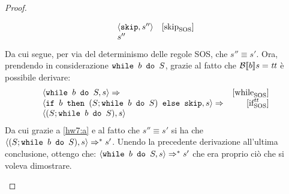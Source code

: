 {\begin{proof}
\begin{itemize}
$$\begin{array}{ll}
		\confSs{\skipForFriends}{s''} & \skipSOS\\
		s''
	\end{array}
	$$
	Da cui segue, per via del determinismo delle regole SOS, che $s'' \equiv s'$.
	Ora, prendendo in considerazione $\wbS{b}{S}$, grazie al fatto che
	$\B{b} = \semtrue$ è possibile derivare:
	$$
	\begin{array}{lr}
	\confSs{\wbS{b}{S}}{s} \Rar{ } & \whileSOS \\
	\confSs{\ifABC{b}{(S; \wbS{b}{S})}{\skipForFriends}}{s}  \Rar{ } & \ifttSOS \\
	\confSs{(S; \wbS{b}{S})}{s} & \\
	\end{array}
	$$
	Da cui grazie a \ref{hw7:a} e al fatto che $s'' \equiv s'$ si ha che
	$\confSs{(S; \wbS{b}{S})}{s} \Rar{*} s'$. Unendo la precedente derivazione
	all'ultima conclusione, ottengo che:
	$\confSs{\wbS{b}{S}}{s} \Rar{*} s'$ che era proprio ciò che si voleva
	dimostrare.

\end{itemize}

\end{proof}


}
